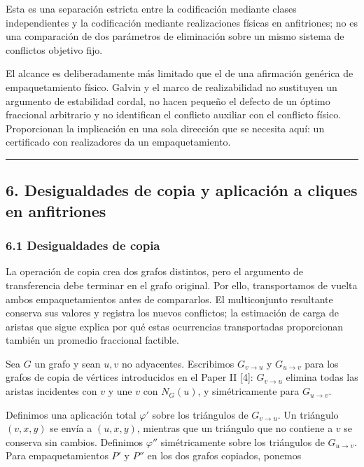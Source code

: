 \documentclass[spanish,11pt,a4paper]{article}
\begin{document}
Esta es una separación estricta entre la codificación mediante clases
independientes y la codificación mediante realizaciones físicas en
anfitriones; no es una comparación de dos parámetros de eliminación
sobre un mismo sistema de conflictos objetivo fijo.

El alcance es deliberadamente más limitado que el de una afirmación
genérica de empaquetamiento físico. Galvin y el marco de realizabilidad
no sustituyen un argumento de estabilidad cordal, no hacen pequeño el
defecto de un óptimo fraccional arbitrario y no identifican el conflicto
auxiliar con el conflicto físico. Proporcionan la implicación en una
sola dirección que se necesita aquí: un certificado con realizadores da
un empaquetamiento.

\begin{center}\rule{0.5\linewidth}{0.5pt}\end{center}

\subsection{6. Desigualdades de copia y aplicación a cliques en
anfitriones}\label{desigualdades-de-copia-y-aplicaciuxf3n-a-cliques-en-anfitriones}

\subsubsection{6.1 Desigualdades de copia}\label{desigualdades-de-copia}

La operación de copia crea dos grafos distintos, pero el argumento de
transferencia debe terminar en el grafo original. Por ello,
transportamos de vuelta ambos empaquetamientos antes de compararlos. El
multiconjunto resultante conserva sus valores y registra los nuevos
conflictos; la estimación de carga de aristas que sigue explica por qué
estas ocurrencias transportadas proporcionan también un promedio
fraccional factible.

Sea \(G\) un grafo y sean \(u,v\) no adyacentes. Escribimos
\(G_{v\to u}\) y \(G_{u\to v}\) para los grafos de copia de vértices
introducidos en el Paper II {[}4{]}: \(G_{v\to u}\) elimina todas las
aristas incidentes con \(v\) y une \(v\) con \(N_G(u)\), y
simétricamente para \(G_{u\to v}\).

Definimos una aplicación total \(\varphi'\) sobre los triángulos de
\(G_{v\to u}\). Un triángulo \((v,x,y)\) se envía a \((u,x,y)\),
mientras que un triángulo que no contiene a \(v\) se conserva sin
cambios. Definimos \(\varphi''\) simétricamente sobre los triángulos de
\(G_{u\to v}\). Para empaquetamientos \(P'\) y \(P''\) en los dos grafos
copiados, ponemos
\end{document}
